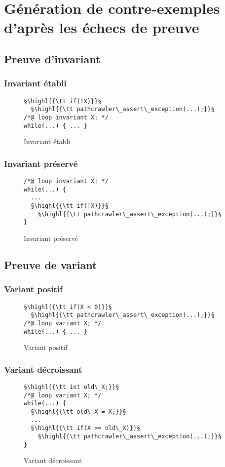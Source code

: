 
\chapter{Génération de contre-exemples d'après les échecs de preuve}

\section{Preuve d'invariant}

\subsection{Invariant établi}

\begin{figure}[h]
  \begin{lstlisting}
§\highl{{\tt if(!X)}}§
  §\highl{{\tt pathcrawler\_assert\_exception(...);}}§
/*@ loop invariant X; */
while(...) { ... }
  \end{lstlisting}
  \caption{Invariant établi}
\end{figure}

\subsection{Invariant préservé}

\begin{figure}[h]
  \begin{lstlisting}
/*@ loop invariant X; */
while(...) {
  ...
  §\highl{{\tt if(!X)}}§
    §\highl{{\tt pathcrawler\_assert\_exception(...);}}§
}
  \end{lstlisting}
  \caption{Invariant préservé}
\end{figure}

\section{Preuve de variant}

\subsection{Variant positif}

\begin{figure}[h]
  \begin{lstlisting}
§\highl{{\tt if(X < 0)}}§
  §\highl{{\tt pathcrawler\_assert\_exception(...);}}§
/*@ loop variant X; */
while(...) { ... }
  \end{lstlisting}
  \caption{Variant positif}
\end{figure}

\subsection{Variant décroissant}

\begin{figure}[h]
  \begin{lstlisting}
§\highl{{\tt int old\_X;}}§
/*@ loop variant X; */
while(...) {
  §\highl{{\tt old\_X = X;}}§
  ...
  §\highl{{\tt if(X >= old\_X)}}§
    §\highl{{\tt pathcrawler\_assert\_exception(...);}}§
}
  \end{lstlisting}
  \caption{Variant décroissant}
\end{figure}
